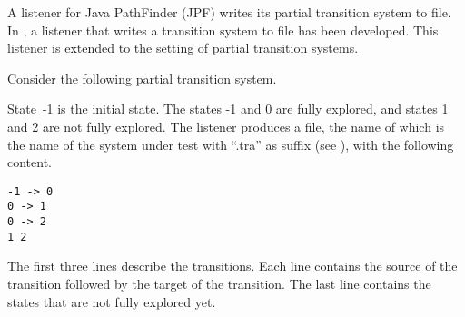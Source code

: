 \documentclass[12pt]{article}
\theoremstyle{definition}
\begin{document}
A listener for Java PathFinder (JPF) writes its partial transition system to file.  In \cite[Section~7.3]{B20}, a listener that writes a transition system to file has been developed.  This listener is extended to the setting of partial transition systems.

Consider the following partial transition system.
\begin{center}
\end{center}
State~-1 is the initial state.  The states -1 and 0 are fully explored, and  states 1 and 2 are not fully explored.  The listener produces a file, the name of which is the name of the system under test with ``.tra'' as suffix (see \cite[Section 7.4]{B20}), with the following content.
\begin{verbatim}
-1 -> 0
0 -> 1
0 -> 2
1 2
\end{verbatim}
The first three lines describe the transitions.  Each line contains the source of the transition followed by the target of the transition.  The last line contains the states that are not fully explored yet.



\end{document}
